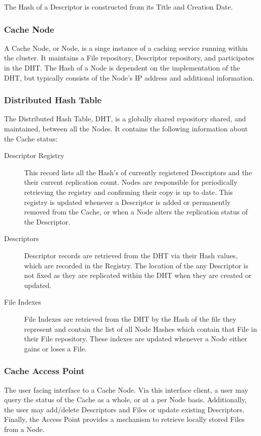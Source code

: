 \documentclass[letterpaper,11pt]{article}
\begin{document}
The Hash of a Descriptor is constructed from its Title and Creation Date.

\subsubsection{Cache Node}

A Cache Node, or Node, is a singe instance of a caching service running within the cluster. It maintains a File repository, Descriptor repository, and participates in the DHT. The Hash of a Node is dependent on the implementation of the DHT, but typically consists of the Node's IP address and additional information.

\subsubsection{Distributed Hash Table}

The Distributed Hash Table\cite{springerlink}\cite{Stoica01chord}\cite{Zhao04tapestry}, DHT, is a globally shared repository shared, and maintained, between all the Nodes. It contains the following information about the Cache status:
\begin{description}
\item[Descriptor Registry] This record lists all the Hash's of currently registered Descriptors and the their current replication count. Nodes are responsible for periodically retrieving the registry and confirming their copy is up to date. This registry is updated whenever a Descriptor is added or permanently removed from the Cache, or when a Node alters the replication status of the Descriptor.
\item[Descriptors] Descriptor records are retrieved from the DHT via their Hash values, which are recorded in the Registry. The location of the any Descriptor is not fixed as they are replicated within the DHT when they are created or updated.
\item[File Indexes] File Indexes are retrieved from the DHT by the Hash of the file they represent and contain the list of all Node Hashes which contain that File in their File repository. These indexes are updated whenever a Node either gains or loses a File.
\end{description}

\subsubsection{Cache Access Point}

The user facing interface to a Cache Node. Via this interface client, a user may query the status of the Cache as a whole, or at a per Node basis. Additionally, the user may add/delete Descriptors and Files or update existing Descriptors. Finally, the Access Point provides a mechanism to retrieve locally stored Files from a Node.
\end{document}
